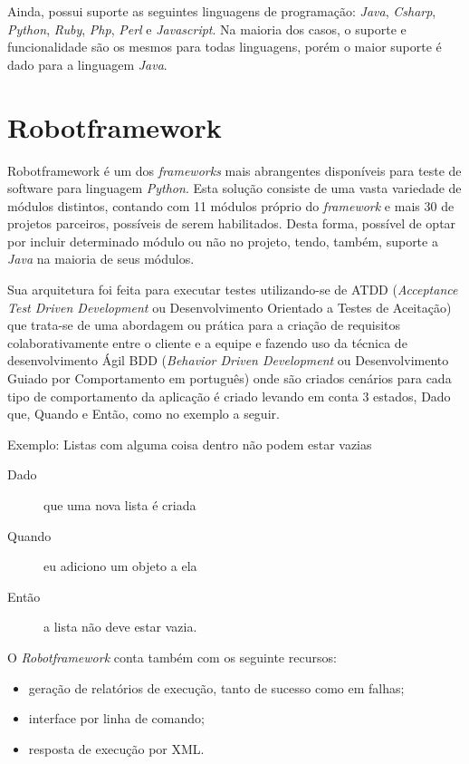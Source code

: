         Ainda, possui suporte as seguintes linguagens de programação: \emph{Java}, \emph{Csharp}, \emph{Python}, \emph{Ruby}, \emph{Php}, \emph{Perl} e \emph{Javascript}. Na maioria
        dos casos, o suporte e funcionalidade são os mesmos para todas linguagens, porém o maior suporte é dado para a linguagem \emph{Java}.


    \section{Robotframework}

        {Robotframework \cite{robotframework} é um dos \emph{frameworks} mais abrangentes disponíveis para teste de software para linguagem \emph{Python}. Esta solução consiste
        de uma vasta variedade de módulos distintos, contando com 11 módulos próprio do \emph{framework} e mais 30 de projetos parceiros, possíveis de serem habilitados. Desta forma,
        possível de optar por incluir determinado módulo ou não no projeto, tendo, também, suporte a \emph{Java} na maioria de seus módulos.

        Sua arquitetura foi feita para executar testes utilizando-se de ATDD (\emph{Acceptance Test Driven Development} ou Desenvolvimento Orientado a Testes de Aceitação) que trata-se de uma
        abordagem ou prática para a criação de requisitos colaborativamente entre o cliente e a equipe e fazendo uso da técnica de desenvolvimento Ágil BDD
        (\emph{Behavior Driven Development} ou Desenvolvimento Guiado por Comportamento em português) onde são criados cenários para cada tipo de comportamento da aplicação é criado levando em
        conta 3 estados, Dado que, Quando e Então, como no exemplo a seguir.

        \vspace*{0,5cm}
        Exemplo: Listas com alguma coisa dentro não podem estar vazias
        \begin{description}
            \item[Dado] que uma nova lista é criada
            \item[Quando] eu adiciono um objeto a ela
            \item[Então] a lista não deve estar vazia.
        \end{description}
        \vspace*{0,5cm}

        O \emph{Robotframework} conta também com os seguinte recursos:
        \begin{itemize}
            \item geração de relatórios de execução, tanto de sucesso como em falhas;
            \item interface por linha de comando;
            \item resposta de execução por XML.
        \end{itemize}


}
